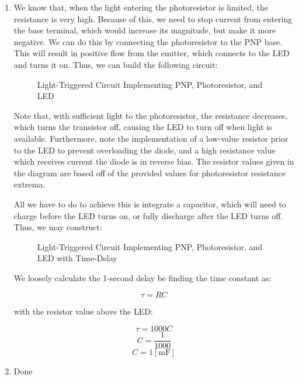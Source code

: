 \begin{enumerate}
  \item

    We know that, when the light entering the photoresistor is limited, the resistance is very high. Because of this, we need to stop current from entering the base terminal, which would increase its magnitude, but make it more negative. We can do this by connecting the photoresistor to the PNP base. This will result in positive flow from the emitter, which connects to the LED and turns it on. Thus, we can build the following circuit:

    \begin{figure}[H]
      \centering
      
      \caption{Light-Triggered Circuit Implementing PNP, Photoresistor, and LED}
      \label{fig:1}
    \end{figure}

    Note that, with sufficient light to the photoresistor, the resistance decreases, which turns the transistor off, causing the LED to turn off when light is available. Furthermore, note the implementation of a low-value resistor prior to the LED to prevent overloading the diode, and a high resistance value which receives current the diode is in reverse bias. The resistor values given in the diagram are based off of the provided values for photoresistor resistance extrema.

    All we have to do to achieve this is integrate a capacitor, which will need to charge before the LED turns on, or fully discharge after the LED turns off. Thus, we may construct:

    \begin{figure}[H]
      \centering
      
      \caption{Light-Triggered Circuit Implementing PNP, Photoresistor, and LED with Time-Delay}
      \label{fig:2}
    \end{figure}

    We loosely calculate the 1-second delay be finding the time constant as:

    $$\tau=RC$$

    with the resistor value above the LED:

    $$\tau=1000C$$
    $$C=\frac{1}{1000}$$
    $$C=1[\si{\milli\farad}]$$

  \item Done \textcolor{green}{\checkmark}

\end{enumerate}



